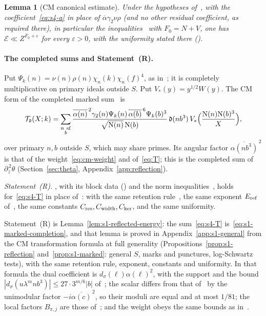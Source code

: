\documentclass[11pt]{article}
\numberwithin{equation}{section}
\newcommand{\N}{\mathrm N}
\newtheorem{lemma}{Lemma}
\begin{document}
\begin{lemma}[CM canonical estimate]\label{lem:s4-canonical}
Under the hypotheses of~\cite[Lemma~17.2]{OAI78}, with the coefficient~\eqref{eq:s4-a} in place of $\overline\alpha\gamma_2\nu\rho$ (and no other
residual coefficient, as required there), in particular the inequalities~\cite[eq.~(17.2)]{OAI78} with $F_0=N+V$, one has
$\mathcal E\ll Z^{F_0+\varepsilon}$ for every $\varepsilon>0$, with the uniformity stated there (\cite[Lemma~17.2]{OAI78}).
\end{lemma}

\paragraph{The completed sums and Statement~(R).} Put $\Psi_k(n)=\nu(n)\rho(n)\chi_n(k)\chi_n(f)^4$, as
in~\cite[Section~14.1]{OAI78}; it is completely multiplicative on primary ideals outside $S$. Put $V_*(y)=y^{1/2}W(y)$.
The CM form of the completed marked sum~\cite[eq.~(14.2)]{OAI78} is
\begin{equation}\label{eq:s4-T}
 \mathcal T_{\mathfrak d}(X;k)=\sum_{\substack{n\ {\rm sf}\\b}}
 \frac{\overline{\alpha(n)}^{\,2}\gamma_2(n)\Psi_k(n)\,\overline{\alpha(b)}^{\,6}\Psi_k(b)^3}{\sqrt{\N(n)}\,\N(b)}\,
 \mathfrak d(nb^3)\,V_*\Bigl(\frac{\N(n)\N(b)^3}X\Bigr),
\end{equation}
over primary $n,b$ outside $S$, which may share primes. Its angular factor $\overline{\alpha(nb^3)}^{\,2}$ is that
of the weight~\eqref{eq:cm-weight} and of~\eqref{eq:T}; this is the completed sum of
$\partial_{\bar z}^{\,2}\theta$ (Section~\ref{sec:theta}, Appendix~\ref{app:reflection}).

\smallskip\noindent\emph{Statement~{\rm(R)}.} \cite[Lemma~14.3 and its proof]{OAI78}, with its block
data (\cite[Section~14.4, \emph{Reflected block data}]{OAI78}) and the norm inequalities~\cite[eqs.~(5.35) and~(14.17)]{OAI78}, holds for~\eqref{eq:s4-T} in place of~\cite[eq.~(14.2)]{OAI78}: with the same
retention rule~\cite[eq.~(14.11)]{OAI78}, the same exponent $E_{\rm ref}$ of~\cite[eq.~(14.14)]{OAI78},
the same constants $C_{\rm res},C_{\rm width},C_{\rm ker}$, and the same uniformity.

\smallskip
Statement~(R) is Lemma~\ref{lem:s1-reflected-energy}: the sum~\eqref{eq:s4-T} is~\eqref{eq:s1-marked-completion},
and that lemma is proved in Appendix~\ref{app:s1-general} from the CM transformation formula at full generality
(Propositions~\ref{prop:s1-reflection} and~\ref{prop:s1-marked}: general $S$, marks and punctures, log-Schwartz
tests), with the same retention rule, exponent, constants and uniformity. In that formula the dual coefficient is
$d_\sigma(\ell)\alpha(\ell)^2$, with the support and the bound $|d_\sigma(u\lambda^mnb^3)|\le27\cdot3^{m/6}|b|$
of~\cite[eq.~(5.2)]{OAI78}; the scalar differs from that of~\cite{OAI78} by the
unimodular factor $-i\overline{\alpha(c)}^{\,2}$, so their moduli are equal and at most $1/81$; the local
factors $B_{\pi,j}$ are those of~\cite{OAI78}; and the weight obeys the same bounds as in~\cite{OAI78}.
\end{document}
